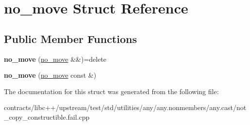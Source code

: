 \hypertarget{structno__move}{}\section{no\+\_\+move Struct Reference}
\label{structno__move}
\subsection*{Public Member Functions}
\begin{DoxyCompactItemize}
\item 
\mbox{\label{structno__move_ad10b81202f7b0518ceea5568e707856d}} 
{\bfseries no\+\_\+move} (\mbox{\hyperlink{structno__move}{no\+\_\+move}} \&\&)=delete
\item 
\mbox{\label{structno__move_a93ab3e7e0b4edac110f7fb75f0c85831}} 
{\bfseries no\+\_\+move} (\mbox{\hyperlink{structno__move}{no\+\_\+move}} const \&)
\end{DoxyCompactItemize}


The documentation for this struct was generated from the following file\+:\begin{DoxyCompactItemize}
\item 
contracts/libc++/upstream/test/std/utilities/any/any.\+nonmembers/any.\+cast/not\+\_\+copy\+\_\+constructible.\+fail.\+cpp\end{DoxyCompactItemize}
